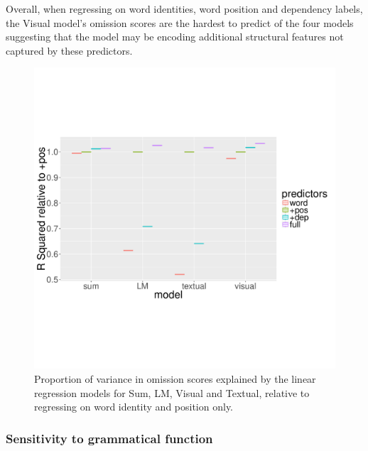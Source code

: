 Overall, when regressing on word identities, word position and
dependency labels, the {\sc Visual} model's omission scores are the
hardest to predict of the four models suggesting that the model may be
encoding additional structural features not captured by these
predictors.

\begin{figure}
\centering
  \includegraphics[scale=0.35]{position-new.pdf}
\caption{Proportion of variance in omission scores explained by the
  linear regression models
 for {\sc Sum}, {\sc LM}, {\sc Visual} and {\sc Textual}, relative to
 regressing on word identity and position only. }
\label{fig:rsquared}
\end{figure}


\subsubsection{Sensitivity to grammatical function}
\label{sec:gramfunc}


